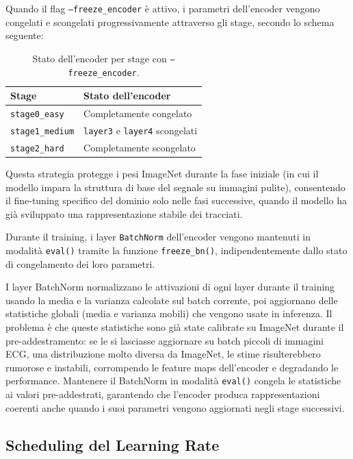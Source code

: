 Quando il flag \texttt{--freeze\_encoder} è attivo, i parametri dell'encoder vengono congelati e scongelati progressivamente attraverso gli stage, secondo lo schema seguente:

\begin{table}[H]
\centering
\caption{Stato dell'encoder per stage con \texttt{--freeze\_encoder}.}
\label{tab:extractor_freeze}
\begin{tabular}{ll}
\hline
\textbf{Stage} & \textbf{Stato dell'encoder} \\
\hline
\texttt{stage0\_easy}   & Completamente congelato \\
\texttt{stage1\_medium} & \texttt{layer3} e \texttt{layer4} scongelati \\
\texttt{stage2\_hard}   & Completamente scongelato \\
\hline
\end{tabular}
\end{table}

Questa strategia protegge i pesi ImageNet durante la fase iniziale (in cui il modello impara la struttura di base del segnale su immagini pulite), consentendo il fine-tuning specifico del dominio solo nelle fasi successive, quando il modello ha già sviluppato una rappresentazione stabile dei tracciati.

Durante il training, i layer \texttt{BatchNorm} dell'encoder vengono mantenuti in modalità \texttt{eval()} tramite la funzione \texttt{freeze\_bn()}, indipendentemente dallo stato di congelamento dei loro parametri.

I layer BatchNorm normalizzano le attivazioni di ogni layer durante il training usando la media e la varianza calcolate sul batch corrente, poi aggiornano delle statistiche globali (media e varianza mobili) che vengono usate in inferenza. Il problema è che queste statistiche sono già state calibrate su ImageNet durante il pre-addestramento: se le si lasciasse aggiornare su batch piccoli di immagini ECG, una distribuzione molto diversa da ImageNet, le stime risulterebbero rumorose e instabili, corrompendo le feature maps dell'encoder e degradando le performance. Mantenere il BatchNorm in modalità \texttt{eval()} congela le statistiche ai valori pre-addestrati, garantendo che l'encoder produca rappresentazioni coerenti anche quando i suoi parametri vengono aggiornati negli stage successivi.

\subsection{Scheduling del Learning Rate}

